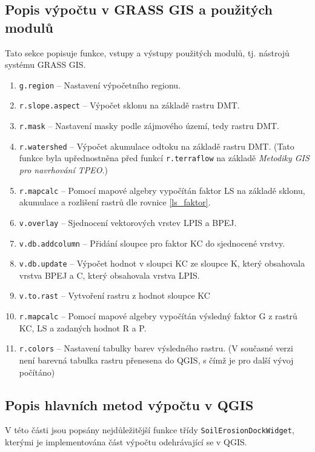 \subsection{Popis výpočtu v GRASS GIS a použitých modulů} Tato sekce
popisuje funkce, vstupy a výstupy použitých modulů, tj. nástrojů systému GRASS GIS.
\begin{enumerate}
	\item \texttt{g.region} – Nastavení výpočetního regionu.
	\item \texttt{r.slope.aspect} – Výpočet sklonu na základě
          rastru DMT.
	\item \texttt{r.mask} – Nastavení masky podle zájmového území,
tedy rastru DMT.
	\item \texttt{r.watershed} – Výpočet akumulace odtoku na
základě rastru DMT. (Tato funkce byla upřednostněna před funkcí
\texttt{r.terraflow} na základě \textit{Metodiky GIS pro navrhování
TPEO}\cite{Dostal2014}.)
	\item \texttt{r.mapcalc} – Pomocí mapové algebry vypočítán
faktor LS na základě sklonu, akumulace a rozlišení rastrů dle rovnice
\ref{ls_faktor}.
	\item \texttt{v.overlay} – Sjednocení vektorových vrstev LPIS
a BPEJ.
	\item \texttt{v.db.addcolumn} – Přidání sloupce pro faktor KC
do sjednocené vrstvy.
	\item \texttt{v.db.update} – Výpočet hodnot v sloupci KC ze
sloupce K, který obsahovala vrstva BPEJ a C, který obsahovala vrstva
LPIS.
	\item \texttt{v.to.rast} – Vytvoření rastru z hodnot sloupce
KC
	\item \texttt{r.mapcalc} – Pomocí mapové algebry vypočítán
výsledný faktor G z rastrů KC, LS a zadaných hodnot R a P.
	\item \texttt{r.colors} – Nastavení tabulky barev výsledného rastru. (V
současné verzi není barevná tabulka rastru přenesena do QGIS, s čímž
je pro další vývoj počítáno)
\end{enumerate}
\newpage
\subsection{Popis hlavních metod výpočtu v QGIS} V této části jsou
popsány nejdůležitější funkce třídy \texttt{SoilErosionDockWidget},
kterými je implementována část výpočtu odehrávající se v QGIS.

